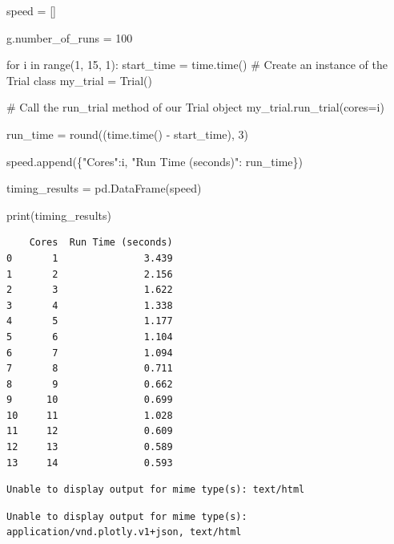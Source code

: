 \documentclass[
  letterpaper,
  DIV=11,
  numbers=noendperiod]{scrreprt}
\newenvironment{Shaded}{\begin{snugshade}}{\end{snugshade}}
\newcommand{\BuiltInTok}[1]{\textcolor[rgb]{0.00,0.23,0.31}{#1}}
\newcommand{\CommentTok}[1]{\textcolor[rgb]{0.37,0.37,0.37}{#1}}
\newcommand{\ControlFlowTok}[1]{\textcolor[rgb]{0.00,0.23,0.31}{#1}}
\newcommand{\DecValTok}[1]{\textcolor[rgb]{0.68,0.00,0.00}{#1}}
\newcommand{\KeywordTok}[1]{\textcolor[rgb]{0.00,0.23,0.31}{#1}}
\newcommand{\NormalTok}[1]{\textcolor[rgb]{0.00,0.23,0.31}{#1}}
\newcommand{\OperatorTok}[1]{\textcolor[rgb]{0.37,0.37,0.37}{#1}}
\newcommand{\StringTok}[1]{\textcolor[rgb]{0.13,0.47,0.30}{#1}}
\begin{document}
\begin{Shaded}
\begin{Highlighting}[]
\NormalTok{speed }\OperatorTok{=}\NormalTok{ []}

\NormalTok{g.number\_of\_runs }\OperatorTok{=} \DecValTok{100}

\ControlFlowTok{for}\NormalTok{ i }\KeywordTok{in} \BuiltInTok{range}\NormalTok{(}\DecValTok{1}\NormalTok{, }\DecValTok{15}\NormalTok{, }\DecValTok{1}\NormalTok{):}
\NormalTok{    start\_time }\OperatorTok{=}\NormalTok{ time.time()}
    \CommentTok{\# Create an instance of the Trial class}
\NormalTok{    my\_trial }\OperatorTok{=}\NormalTok{ Trial()}

    \CommentTok{\# Call the run\_trial method of our Trial object}
\NormalTok{    my\_trial.run\_trial(cores}\OperatorTok{=}\NormalTok{i)}

\NormalTok{    run\_time }\OperatorTok{=} \BuiltInTok{round}\NormalTok{((time.time() }\OperatorTok{{-}}\NormalTok{ start\_time), }\DecValTok{3}\NormalTok{)}

\NormalTok{    speed.append(\{}\StringTok{"Cores"}\NormalTok{:i, }\StringTok{"Run Time (seconds)"}\NormalTok{: run\_time\})}

\NormalTok{timing\_results }\OperatorTok{=}\NormalTok{ pd.DataFrame(speed)}

\BuiltInTok{print}\NormalTok{(timing\_results)}
\end{Highlighting}
\end{Shaded}

\begin{verbatim}
    Cores  Run Time (seconds)
0       1               3.439
1       2               2.156
2       3               1.622
3       4               1.338
4       5               1.177
5       6               1.104
6       7               1.094
7       8               0.711
8       9               0.662
9      10               0.699
10     11               1.028
11     12               0.609
12     13               0.589
13     14               0.593
\end{verbatim}

\begin{verbatim}
Unable to display output for mime type(s): text/html
\end{verbatim}

\begin{verbatim}
Unable to display output for mime type(s): application/vnd.plotly.v1+json, text/html
\end{verbatim}
\end{document}
